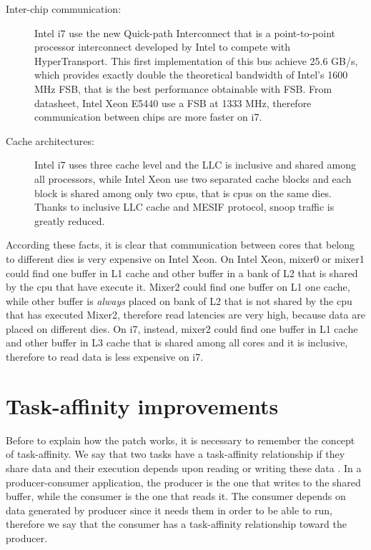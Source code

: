 \begin{description}

\item[Inter-chip communication:] Intel i7 use the new Quick-path Interconnect that is a point-to-point processor interconnect developed by Intel to compete 
with HyperTransport. This first implementation of this bus achieve 25.6 GB/s, which provides exactly double the theoretical bandwidth of Intel's 1600 MHz 
FSB, that is the best performance obtainable with FSB. From datasheet, Intel Xeon E5440 use a FSB at 1333 MHz, therefore communication between chips are 
more faster on i7.

\item[Cache architectures:] Intel i7 uses three cache level and the LLC is inclusive and shared among all processors, while Intel Xeon use two separated 
cache blocks and each block is shared among only two cpus, that is cpus on the same dies. Thanks to inclusive LLC cache and MESIF protocol, snoop traffic
is greatly reduced.
\end{description}

According these facts, it is clear that communication between cores that belong to different dies is very expensive on Intel Xeon. On Intel Xeon, mixer0 
or mixer1 could find one buffer in L1 cache and other buffer in a bank of L2 that is shared by the cpu that have execute it. Mixer2 could find one buffer 
on L1 one cache, while other buffer is \textit{always} placed on bank of L2 that is not shared by the cpu that has executed Mixer2, therefore read 
latencies are very high, because data are placed on different dies. On i7, instead, mixer2 could find one buffer in L1 cache and other buffer in L3 cache 
that is shared among all cores and it is inclusive, therefore to read data is less expensive on i7.

\section{Task-affinity improvements}

Before to explain how the patch works, it is necessary to remember the concept of task-affinity. We say that two tasks have a task-affinity relationship if 
they share data and their execution depends upon reading or writing these data \cite{lcs}. In a producer-consumer application, the producer is the one that 
writes to the shared buffer, while the consumer is the one that reads it. The consumer depends on data generated by producer since it needs them in order 
to be able to run, therefore we say that the consumer has a task-affinity relationship toward the producer.

